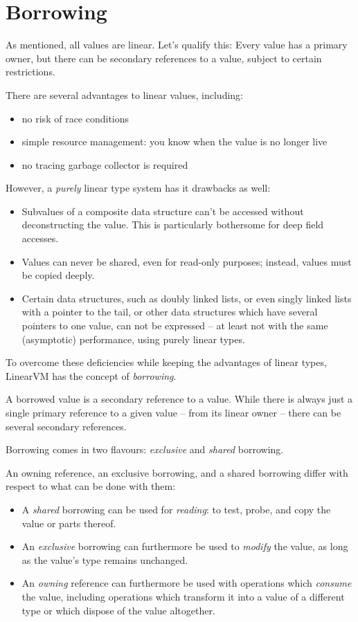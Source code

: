 \documentclass[a4paper]{book}
\begin{document}
\section{Borrowing}
As mentioned, all values are linear.  Let's qualify this: Every value
has a primary owner, but there can be secondary references to a value,
subject to certain restrictions.

There are several advantages to linear values, including:
\begin{itemize}
\item no risk of race conditions
\item simple resource management: you know when the value is no longer live
\item no tracing garbage collector is required
\end{itemize}

\noindent
However, a \emph{purely} linear type system has it drawbacks as well:
\begin{itemize}
\item Subvalues of a composite data structure can't be accessed
  without deconstructing the value. This is particularly bothersome
  for deep field accesses.

\item Values can never be shared, even for read-only purposes; instead,
  values must be copied deeply.

\item Certain data structures, such as doubly linked lists, or even
  singly linked lists with a pointer to the tail, or other data
  structures which have several pointers to one value, can not be
  expressed -- at least not with the same (asymptotic) performance,
  using purely linear types.
\end{itemize}

To overcome these deficiencies while keeping the advantages of linear types,
LinearVM has the concept of \emph{borrowing}.

A borrowed value is a secondary reference to a value.
While there is always just a single primary reference to a given value
-- from its linear owner -- there can be several secondary references.

Borrowing comes in two flavours: \emph{exclusive} and \emph{shared} borrowing.

An owning reference, an exclusive borrowing, and a shared borrowing differ
with respect to what can be done with them:
\begin{itemize}
\item A \emph{shared} borrowing can be used for \emph{reading}: to test,
  probe, and copy the value or parts thereof.
\item An \emph{exclusive} borrowing can furthermore be used to \emph{modify} the value,
  as long as the value's type remains unchanged.

\item An \emph{owning} reference can furthermore be used with
  operations which \emph{consume} the value, including operations
  which transform it into a value of a different type or which dispose
  of the value altogether.
\end{itemize}
\end{document}
